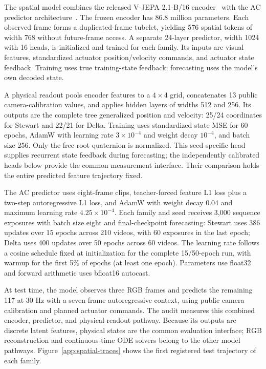 The spatial model combines the released V-JEPA 2.1-B/16 encoder~\cite{murlabadia2026vjepa2_1} with the AC predictor architecture~\cite{assran2025vjepa2}. The frozen encoder has 86.8 million parameters. Each observed frame forms a duplicated-frame tubelet, yielding 576 spatial tokens of width 768 without future-frame access. A separate 24-layer predictor, width 1024 with 16 heads, is initialized and trained for each family. Its inputs are visual features, standardized actuator position/velocity commands, and actuator state feedback. Training uses true training-state feedback; forecasting uses the model's own decoded state.

A physical readout pools encoder features to a $4\times4$ grid, concatenates 13 public camera-calibration values, and applies hidden layers of widths 512 and 256. Its outputs are the complete tree generalized position and velocity: 25/24 coordinates for Stewart and 22/21 for Delta. Training uses standardized state MSE for 60 epochs, AdamW with learning rate $3\times10^{-4}$ and weight decay $10^{-4}$, and batch size 256. Only the free-root quaternion is normalized. This seed-specific head supplies recurrent state feedback during forecasting; the independently calibrated heads below provide the common measurement interface. Their comparison holds the entire predicted feature trajectory fixed.

The AC predictor uses eight-frame clips, teacher-forced feature L1 loss plus a two-step autoregressive L1 loss, and AdamW with weight decay 0.04 and maximum learning rate $4.25\times10^{-4}$. Each family and seed receives 3,000 sequence exposures with batch size eight and final-checkpoint forecasting: Stewart uses 386 updates over 15 epochs across 210 videos, with 60 exposures in the last epoch; Delta uses 400 updates over 50 epochs across 60 videos. The learning rate follows a cosine schedule fixed at initialization for the complete 15/50-epoch run, with warmup for the first 5\% of epochs (at least one epoch). Parameters use float32 and forward arithmetic uses bfloat16 autocast.

At test time, the model observes three RGB frames and predicts the remaining 117 at 30 Hz with a seven-frame autoregressive context, using public camera calibration and planned actuator commands. The audit measures this combined encoder, predictor, and physical-readout pathway. Because its outputs are discrete latent features, physical states are the common evaluation interface; RGB reconstruction and continuous-time ODE solvers belong to the other model pathways. Figure~\ref{app:spatial-traces} shows the first registered test trajectory of each family.

